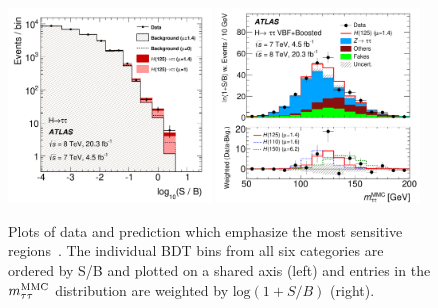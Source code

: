 \begin{figure}[tp]
  \centering
  \includegraphics[width=0.48\textwidth]{figures/HIGG-2013-32/fig_10}
  \includegraphics[width=0.48\textwidth]{figures/HIGG-2013-32/fig_11b}
  \caption{Plots of data and prediction which emphasize the most sensitive regions~\cite{HIGG-2013-32}. The individual BDT bins from all six categories are ordered by S/B and plotted on a shared axis (left) and entries in the $m_{\tau\tau}^\text{MMC}$ distribution are weighted by $\text{log}(1+S/B)$ (right).}
  \label{fig:results-money-plots}
\end{figure}


